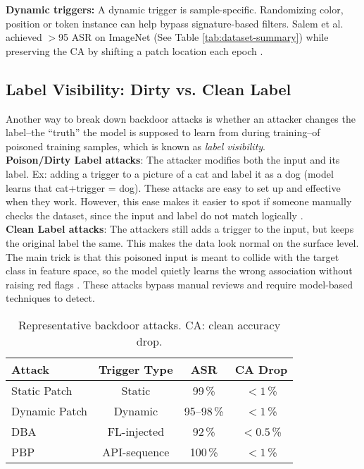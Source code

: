 \documentclass[sigconf,authorversion,nonacm,balance=false]{acmart}
\begin{document}
\noindent
\textbf{Dynamic triggers:} A dynamic trigger is sample-specific. Randomizing color, position or token instance can help bypass signature-based filters. Salem et al. achieved $>$95 ASR on ImageNet (See Table \ref{tab:dataset-summary}) while preserving the CA by shifting a patch location each epoch \cite{attack_salem_2022}.

\subsection{Label Visibility: Dirty vs. Clean Label}
\label{sec:label}

Another way to break down backdoor attacks is whether an attacker changes the label--the “truth” the model is supposed to learn from during training--of poisoned training samples, which is known as \emph{label visibility}. \\
\textbf{Poison/Dirty Label attacks}: The attacker modifies both the input and its label. Ex: adding a trigger to a picture of a cat and label it as a dog (model learns that cat+trigger = dog). These attacks are easy to set up and effective when they work. However, this ease makes it easier to spot if someone manually checks the dataset, since the input and label do not match logically \cite{background_oprea_2022}. \\
\textbf{Clean Label attacks}: The attackers still adds a trigger to the input, but keeps the original label the same. This makes the data look normal on the surface level. The main trick is that this poisoned input is meant to collide with the target class in feature space, so the model quietly learns the wrong association without raising red flags \cite{background_attack_defense_cina_2024}. These attacks bypass manual reviews and require model-based techniques to detect.


\begin{table}[t]
  \centering
  \caption{Representative backdoor attacks.  CA: clean accuracy drop.}
  \label{tab:attack-matrix}
  \begin{tabular}{@{}lccc@{}}
    \toprule
    \textbf{Attack} & \textbf{Trigger Type} & \textbf{ASR} & \textbf{CA Drop}\\
    \midrule
    Static Patch \cite{attack_defense_wang_2023} & Static & 99\,\% & $<\!1$\,\%\\
    Dynamic Patch \cite{attack_salem_2022} & Dynamic & 95–98\,\% & $<\!1$\,\%\\
    DBA \cite{casestudy_walter_2024} & FL-injected & 92\,\% & $<\!0.5$\,\%\\
    PBP \cite{defense_malware_nguyen_2025} & API-sequence & 100\,\% & $<\!1$\,\%\\
    \bottomrule
  \end{tabular}
\end{table}
\end{document}

